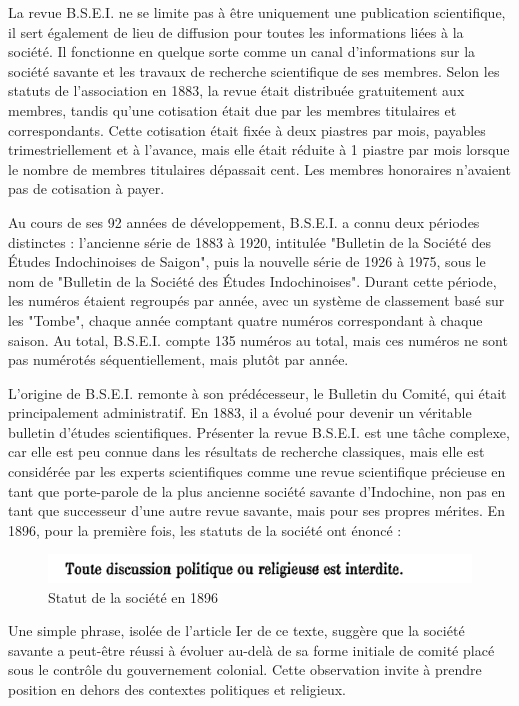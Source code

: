 La revue B.S.E.I. ne se limite pas à être uniquement une publication scientifique, il sert également de lieu de diffusion pour toutes les informations liées à la société. Il fonctionne en quelque sorte comme un canal d'informations sur la société savante et les travaux de recherche scientifique de ses membres. Selon les statuts de l'association en 1883, la revue était distribuée gratuitement aux membres, tandis qu'une cotisation était due par les membres titulaires et correspondants. Cette cotisation était fixée à deux piastres par mois, payables trimestriellement et à l'avance, mais elle était réduite à 1 piastre par mois lorsque le nombre de membres titulaires dépassait cent. Les membres honoraires n'avaient pas de cotisation à payer.

Au cours de ses 92 années de développement, B.S.E.I. a connu deux périodes distinctes : l'ancienne série de 1883 à 1920, intitulée "Bulletin de la Société des Études Indochinoises de Saigon", puis la nouvelle série de 1926 à 1975, sous le nom de "Bulletin de la Société des Études Indochinoises". Durant cette période, les numéros étaient regroupés par année, avec un système de classement basé sur les "Tombe", chaque année comptant quatre numéros correspondant à chaque saison. Au total, B.S.E.I. compte 135 numéros au total, mais ces numéros ne sont pas numérotés séquentiellement, mais plutôt par année.

L'origine de B.S.E.I. remonte à son prédécesseur, le Bulletin du Comité, qui était principalement administratif. En 1883, il a évolué pour devenir un véritable bulletin d'études scientifiques. Présenter la revue B.S.E.I. est une tâche complexe, car elle est peu connue dans les résultats de recherche classiques, mais elle est considérée par les experts scientifiques comme une revue scientifique précieuse en tant que porte-parole de la plus ancienne société savante d'Indochine, non pas en tant que successeur d'une autre revue savante, mais pour ses propres mérites. En 1896, pour la première fois, les statuts de la société ont énoncé :

\begin{figure}[H] %
    \centering
    \includegraphics[width=1\linewidth]{img/tout.PNG}
    \caption{Statut de la société en 1896}
    \label{fig:enter-label}
\end{figure}

Une simple phrase, isolée de l'article Ier de ce texte, suggère que la société savante a peut-être réussi à évoluer au-delà de sa forme initiale de comité placé sous le contrôle du gouvernement colonial. Cette observation invite à prendre position en dehors des contextes politiques et religieux.

